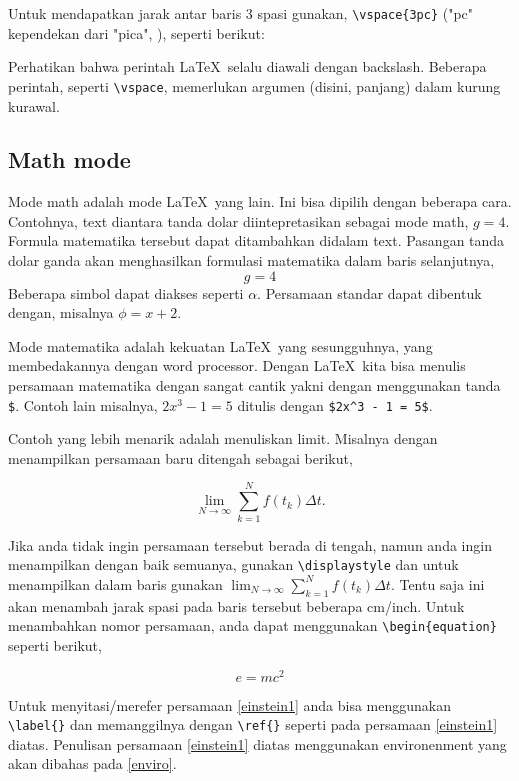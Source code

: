 \documentclass[12pt]{article}
\begin{document}
Untuk mendapatkan jarak antar baris 3 spasi gunakan,  \verb|\vspace{3pc}|
("pc" kependekan dari "pica", ), seperti berikut:
\vspace{3pc}

Perhatikan bahwa perintah \LaTeX\ selalu diawali dengan backslash. 
Beberapa perintah, seperti \verb|\vspace|, memerlukan argumen (disini, panjang) dalam kurung kurawal.

\subsection{Math mode}

Mode math adalah mode \LaTeX\ yang lain. Ini bisa dipilih dengan beberapa cara. Contohnya, text diantara tanda dolar diintepretasikan sebagai mode math, $g=4$. Formula matematika tersebut dapat ditambahkan didalam text. Pasangan tanda dolar ganda akan menghasilkan formulasi matematika dalam baris selanjutnya, $$g=4$$ Beberapa simbol dapat diakses seperti $\alpha$. Persamaan standar dapat dibentuk dengan, misalnya $\phi=x+2$.

Mode matematika adalah kekuatan \LaTeX\ yang sesungguhnya, yang membedakannya dengan word processor. Dengan \LaTeX\ kita bisa menulis persamaan matematika dengan sangat cantik yakni dengan menggunakan tanda \verb|$|.
Contoh lain misalnya, $2x^3 - 1 = 5$ ditulis dengan \verb|$2x^3 - 1 = 5$|. 

Contoh yang lebih menarik adalah menuliskan limit. Misalnya dengan menampilkan persamaan baru ditengah sebagai berikut,

$$\lim_{N \to \infty} \sum_{k=1}^N f(t_k) \Delta t.$$

Jika anda tidak ingin persamaan tersebut berada di tengah, namun anda ingin menampilkan dengan baik semuanya, gunakan  \verb|\displaystyle| dan untuk menampilkan dalam baris gunakan  $\displaystyle \lim_{N \to \infty} \sum_{k=1}^N f(t_k) \Delta t.$  Tentu saja ini akan menambah jarak spasi pada baris tersebut beberapa cm/inch. Untuk menambahkan nomor persamaan, anda dapat menggunakan \verb|\begin{equation}| seperti berikut,

\begin{equation}
    e=mc^2
\label{einstein1} 
\end{equation}

Untuk menyitasi/merefer persamaan \ref{einstein1} anda bisa menggunakan \verb|\label{}| dan memanggilnya dengan \verb|\ref{}| seperti pada persamaan \ref{einstein1} diatas. Penulisan persamaan \ref{einstein1} diatas menggunakan environenment yang akan dibahas pada \ref{enviro}.
\end{document}
